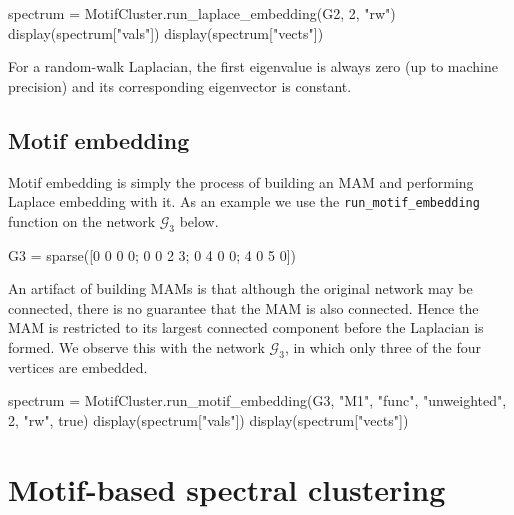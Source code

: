 \documentclass{article}
\begin{document}
\begin{tcolorbox}[colback=black!5!white,colframe=black!15!white]
\begin{juliablock}
spectrum = MotifCluster.run_laplace_embedding(G2, 2, "rw")
display(spectrum["vals"])
display(spectrum["vects"])
\end{juliablock}
\texttt{\obeylines\printpythontex}
\end{tcolorbox}

For a random-walk Laplacian,
the first eigenvalue is always zero (up to machine precision)
and its corresponding eigenvector is constant.

\subsection{Motif embedding}

Motif embedding is simply the process of building an MAM
and performing Laplace embedding with it.
As an example we use the
\texttt{run\_motif\_embedding}
function on the network $\mathcal{G}_3$ below.

\begin{tcolorbox}[colback=black!5!white,colframe=black!15!white]
\begin{juliablock}
G3 = sparse([0 0 0 0; 0 0 2 3; 0 4 0 0; 4 0 5 0])
\end{juliablock}
\end{tcolorbox}

An artifact of building MAMs is that although the original network may
be connected, there is no guarantee that the MAM is also connected.
Hence the MAM is restricted to its largest connected component
before the Laplacian is formed.
We observe this with the network $\mathcal{G}_3$,
in which only three of the four vertices are embedded.

\begin{tcolorbox}[colback=black!5!white,colframe=black!15!white]
\begin{juliablock}
spectrum = MotifCluster.run_motif_embedding(G3, "M1", "func",
                                            "unweighted", 2, "rw", true)
display(spectrum["vals"])
display(spectrum["vects"])
\end{juliablock}
\texttt{\obeylines\printpythontex}
\end{tcolorbox}




\section{Motif-based spectral clustering}
\end{document}
